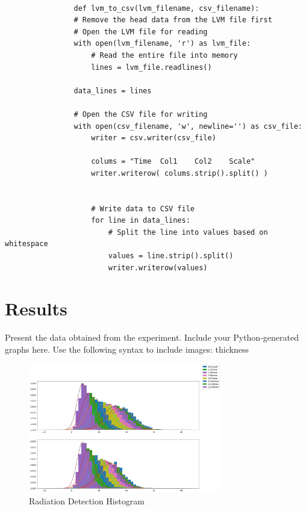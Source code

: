 \documentclass[12pt]{article}
\begin{document}
            \lstset{language=Python}
            \lstset{frame=lines}
            \lstset{basicstyle=\footnotesize}
            \begin{lstlisting}

                def lvm_to_csv(lvm_filename, csv_filename):
                # Remove the head data from the LVM file first
                # Open the LVM file for reading
                with open(lvm_filename, 'r') as lvm_file:
                    # Read the entire file into memory
                    lines = lvm_file.readlines()
            
                data_lines = lines
            
                # Open the CSV file for writing
                with open(csv_filename, 'w', newline='') as csv_file:
                    writer = csv.writer(csv_file)
                    
                    colums = "Time	Col1	Col2	Scale"
                    writer.writerow( colums.strip().split() )
                    
                    
                    # Write data to CSV file
                    for line in data_lines:
                        # Split the line into values based on whitespace
                        values = line.strip().split()
                        writer.writerow(values)
            \end{lstlisting}
                

\section{Results}
    Present the data obtained from the experiment. Include your Python-generated graphs here. Use the following syntax to include images:
    thickness

    \begin{figure}[!htb]
        \centering
        \includegraphics[width=0.75\textwidth]{./img/plots/thickness.png}
        \caption{Radiation Detection Histogram}
        \label{fig:Radiation Detection Histogram}
    \end{figure}
\end{document}
